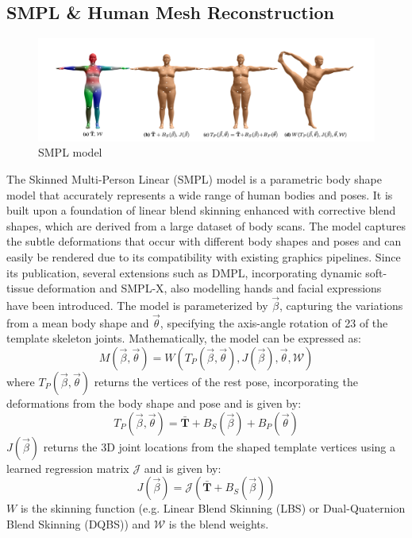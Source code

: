 \documentclass[options]{report}
\begin{document}
\subsection*{SMPL \& Human Mesh Reconstruction }
\begin{figure}[h]
    \centering
    \includegraphics[width=\linewidth]{figures/smpl.png}
    \caption{SMPL model}
\end{figure}
The Skinned Multi-Person Linear (SMPL) model is a parametric body shape model that accurately represents a wide range of human bodies and poses. It is built upon a foundation of linear blend skinning enhanced with corrective blend shapes, which are derived from a large dataset of body scans. The model captures the subtle deformations that occur with different body shapes and poses and can easily be rendered due to its compatibility with existing graphics pipelines. Since its publication, several extensions such as DMPL, incorporating dynamic soft-tissue deformation and SMPL-X, also modelling hands and facial expressions have been introduced. The model is parameterized by $\vec{\beta}$, capturing the variations from a mean body shape and $\vec{\theta}$, specifying the axis-angle rotation of 23 of the template skeleton joints. Mathematically, the model can be expressed as:
\begin{equation}
    M(\vec{\beta}, \vec{\theta}) = W(T_P(\vec{\beta}, \vec{\theta}), J(\vec{\beta}), \vec{\theta}, \mathcal{W})
\end{equation}
where $T_P(\vec{\beta}, \vec{\theta})$ returns the vertices of the rest pose, incorporating the deformations from the body shape and pose and is given by:
\begin{equation}
    T_P(\vec{\beta}, \vec{\theta}) = \mathbf{\bar{T}} + B_S(\vec{\beta}) + B_P(\vec{\theta})
\end{equation}
$J(\vec{\beta})$ returns the 3D joint locations from the shaped template vertices using a learned regression matrix $\mathcal{J}$ and is given by:
\begin{equation}
    J(\vec{\beta}) = \mathcal{J}(\mathbf{\bar{T}} + B_S(\vec{\beta}))
\end{equation}
$W$ is the skinning function (e.g. Linear Blend Skinning (LBS) or Dual-Quaternion Blend Skinning (DQBS)) and $\mathcal{W}$ is the blend weights. 
\end{document}
